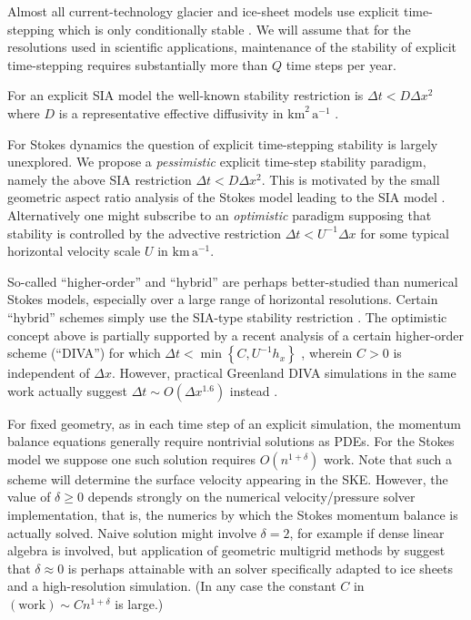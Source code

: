 \documentclass[twocolumn,letterpaper]{igs}
\begin{document}
Almost all current-technology glacier and ice-sheet models use explicit time-stepping which is only conditionally stable \citep{LeVeque2007}.  We will assume that for the resolutions used in scientific applications, maintenance of the stability of explicit time-stepping requires substantially more than $Q$ time steps per year.

For an explicit SIA model the well-known stability restriction is $\Delta t < D \Delta x^2$ where $D$ is a representative effective diffusivity in $\text{km}^2\,\text{a}^{-1}$ \citep{Bueleretal2005,HindmarshPayne1996}.

For Stokes dynamics the question of explicit time-stepping stability is largely unexplored.  We propose a \emph{pessimistic} explicit time-step stability paradigm, namely the above SIA restriction $\Delta t < D \Delta x^2$.  This is motivated by the small geometric aspect ratio analysis of the Stokes model leading to the SIA model \citep{GreveBlatter2009}.  Alternatively one might subscribe to an \emph{optimistic} paradigm supposing that stability is controlled by the advective restriction $\Delta t < U^{-1} \Delta x$ for some typical horizontal velocity scale $U$ in $\text{km}\,\text{a}^{-1}$.

So-called ``higher-order'' and ``hybrid'' are perhaps better-studied than numerical Stokes models, especially over a large range of horizontal resolutions.  Certain ``hybrid'' schemes simply use the SIA-type stability restriction \citep{Winkelmannetal2011}.  The optimistic concept above is partially supported by a recent analysis of a certain higher-order scheme (``DIVA'') for which $\Delta t < \min\left\{C,U^{-1} h_x\right\}$ \citep[equations (52) and (56)]{Robinsonetal2022}, wherein $C>0$ is independent of $\Delta x$.  However, practical Greenland DIVA simulations in the same work actually suggest $\Delta t \sim O(\Delta x^{1.6})$ instead \citep[Figure 3(a)]{Robinsonetal2022}.

For fixed geometry, as in each time step of an explicit simulation, the momentum balance equations generally require nontrivial solutions as PDEs.  For the Stokes model we suppose one such solution requires $O(n^{1+\delta})$ work.  Note that such a scheme will determine the surface velocity appearing in the SKE.  However, the value of $\delta \ge 0$ depends strongly on the numerical velocity/pressure solver implementation, that is, the numerics by which the Stokes momentum balance is actually solved.  Naive solution might involve $\delta=2$, for example if dense linear algebra is involved, but application of geometric multigrid methods by \cite{IsaacStadlerGhattas2015} suggest that $\delta \approx 0$ is perhaps attainable with an solver specifically adapted to ice sheets and a high-resolution simulation.  (In any case the constant $C$ in $(\text{work}) \sim C n^{1+\delta}$ is large.)
\end{document}
